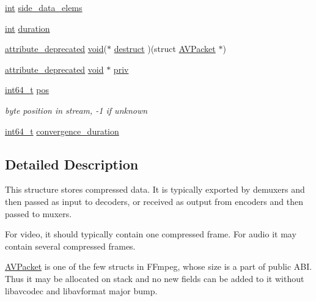 \begin{DoxyCompactItemize}
\begin{tabbing}
\end{tabbing}\item 
\hyperlink{xmltok_8h_a5a0d4a5641ce434f1d23533f2b2e6653}{int} \hyperlink{struct_a_v_packet_af415e25244b26921e8fc249d45499b84}{side\+\_\+data\+\_\+elems}
\item 
\hyperlink{xmltok_8h_a5a0d4a5641ce434f1d23533f2b2e6653}{int} \hyperlink{struct_a_v_packet_af151ba1967c37038088883cd544eeacd}{duration}
\item 
\hyperlink{attributes_8h_aa6d076561d3a9eea4729ee632652de02}{attribute\+\_\+deprecated} \hyperlink{sound_8c_ae35f5844602719cf66324f4de2a658b3}{void}($\ast$ \hyperlink{struct_a_v_packet_ad6441dd4a01abd03fdd05141e6bc4d6d}{destruct} )(struct \hyperlink{struct_a_v_packet}{A\+V\+Packet} $\ast$)
\item 
\hyperlink{attributes_8h_aa6d076561d3a9eea4729ee632652de02}{attribute\+\_\+deprecated} \hyperlink{sound_8c_ae35f5844602719cf66324f4de2a658b3}{void} $\ast$ \hyperlink{struct_a_v_packet_aeba7ec45ff7ac22381ad066f8eafdc96}{priv}
\item 
\hyperlink{lib-src_2ffmpeg_2win32_2stdint_8h_a67a9885ef4908cb72ce26d75b694386c}{int64\+\_\+t} \hyperlink{struct_a_v_packet_ab5793d8195cf4789dfb3913b7a693903}{pos}
\begin{DoxyCompactList}\small\item\em byte position in stream, -\/1 if unknown \end{DoxyCompactList}\item 
\hyperlink{lib-src_2ffmpeg_2win32_2stdint_8h_a67a9885ef4908cb72ce26d75b694386c}{int64\+\_\+t} \hyperlink{struct_a_v_packet_a942409654446e8da1834c17ce69d0ce9}{convergence\+\_\+duration}
\end{DoxyCompactItemize}


\subsection{Detailed Description}
This structure stores compressed data. It is typically exported by demuxers and then passed as input to decoders, or received as output from encoders and then passed to muxers.

For video, it should typically contain one compressed frame. For audio it may contain several compressed frames.

\hyperlink{struct_a_v_packet}{A\+V\+Packet} is one of the few structs in F\+Fmpeg, whose size is a part of public A\+BI. Thus it may be allocated on stack and no new fields can be added to it without libavcodec and libavformat major bump.

